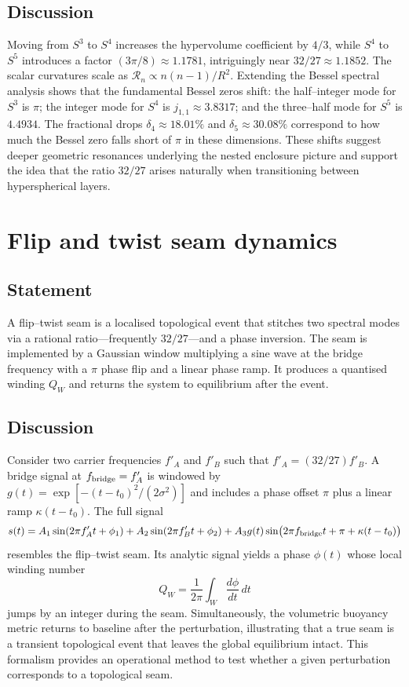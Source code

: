 \documentclass[12pt,a4paper]{article}
\begin{document}
\subsection{Discussion}
Moving from $S^3$ to $S^4$ increases the hypervolume coefficient by $4/3$, while $S^4$ to $S^5$ introduces a factor $(3\pi/8)\approx1.1781$, intriguingly near $32/27\approx1.1852$.  The scalar curvatures scale as $\mathcal{R}_n \propto n(n-1)/R^2$.  Extending the Bessel spectral analysis shows that the fundamental Bessel zeros shift: the half–integer mode for $S^3$ is $\pi$; the integer mode for $S^4$ is $j_{1,1}\approx3.8317$; and the three–half mode for $S^5$ is $4.4934$.  The fractional drops $\delta_4 \approx 18.01\%$ and $\delta_5 \approx30.08\%$ correspond to how much the Bessel zero falls short of $\pi$ in these dimensions.  These shifts suggest deeper geometric resonances underlying the nested enclosure picture and support the idea that the ratio $32/27$ arises naturally when transitioning between hyperspherical layers.

\section{Flip and twist seam dynamics}
\label{sec:flip}
\subsection{Statement}
A flip–twist seam is a localised topological event that stitches two spectral modes via a rational ratio—frequently $32/27$—and a phase inversion.  The seam is implemented by a Gaussian window multiplying a sine wave at the bridge frequency with a $\pi$ phase flip and a linear phase ramp.  It produces a quantised winding $Q_W$ and returns the system to equilibrium after the event.

\subsection{Discussion}
Consider two carrier frequencies $f'_A$ and $f'_B$ such that $f'_A = (32/27) f'_B$.  A bridge signal at $f_{\rm bridge}=f'_A$ is windowed by $g(t)=\exp[-(t-t_0)^2/(2\sigma^2)]$ and includes a phase offset $\pi$ plus a linear ramp $\kappa(t-t_0)$.  The full signal
\[
s(t)=A_1 \sin(2\pi f'_A t + \phi_1) + A_2 \sin(2\pi f'_B t + \phi_2) + A_3 g(t) \sin\bigl(2\pi f_{\rm bridge} t + \pi + \kappa(t-t_0)\bigr)
\]
resembles the flip–twist seam.  Its analytic signal yields a phase $\phi(t)$ whose local winding number
\[
Q_W = \frac{1}{2\pi} \int_{W} \frac{d\phi}{dt} \, dt
\]
jumps by an integer during the seam.  Simultaneously, the volumetric buoyancy metric returns to baseline after the perturbation, illustrating that a true seam is a transient topological event that leaves the global equilibrium intact.  This formalism provides an operational method to test whether a given perturbation corresponds to a topological seam.
\end{document}
